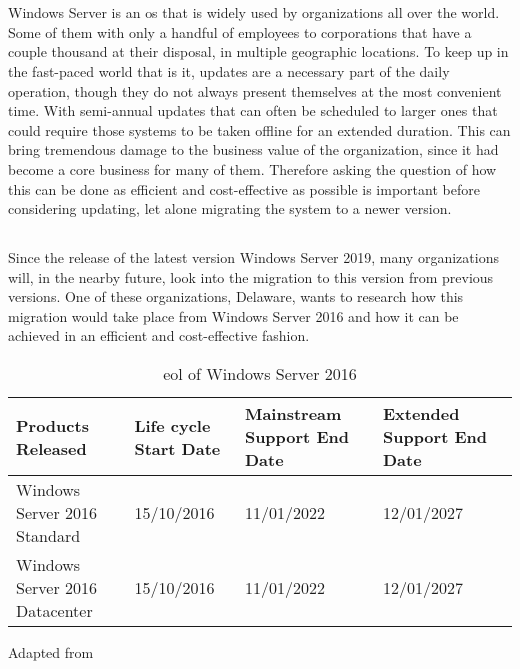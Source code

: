 
\chapter{}
\label{ch:inleiding}

Windows Server is an \acrfull{os} that is widely used by organizations all over the world. Some of them with only a handful of employees to corporations that have a couple thousand at their disposal, in multiple geographic locations. To keep up in the fast-paced world that is \acrfull{it}, updates are a necessary part of the daily operation, though they do not always present themselves at the most convenient time. 
With semi-annual updates that can often be scheduled to larger ones that could require those systems to be taken offline for an extended duration. This can bring tremendous damage to the business value of the organization, since \acrshort{it} had become a core business for many of them. Therefore asking the question of how this can be done as efficient and cost-effective as possible is important before considering updating, let alone migrating the system to a newer version. 


\section{}
\label{sec:probleemstelling}

Since the release of the latest version Windows Server 2019, many organizations will, in the nearby future, look into the migration to this version from previous versions. One of these organizations, Delaware, wants to research how this migration would take place from Windows Server 2016 and how it can be achieved in an efficient and cost-effective fashion. 

\begin{table}[ht]
	\centering
	\begin{adjustbox}{width=1\textwidth}
		\begin{tabular}{l||l|l|l|l}
			Products Released                                                     & Life cycle Start Date & Mainstream Support End Date & Extended Support End Date &\\
			\hline
			\hline
			Windows Server 2016 Standard                                          & 15/10/2016           & 11/01/2022                  & 12/01/2027                &\\
			Windows Server 2016 Datacenter                                        & 15/10/2016			 & 11/01/2022				   & 12/01/2027  			   &\\
		\end{tabular}
	\end{adjustbox}
	\caption{\acrshort{eol} of Windows Server 2016}
	\scriptsize	
	Adapted from \autocite{MicrosoftEOL2019}
	\label{tab:EOL2016}
\end{table}

